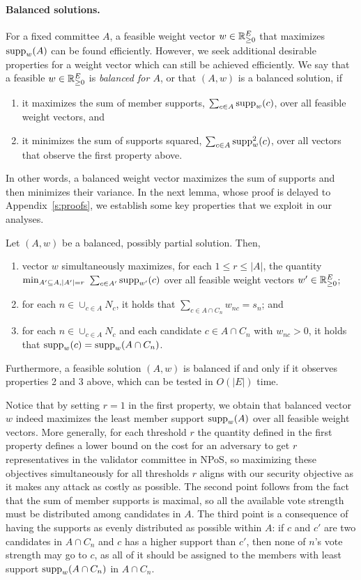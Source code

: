 \paragraph{Balanced solutions.}
For a fixed committee $A$, a feasible weight vector $w\in\mathbb{R}_{\geq 0}^E$ that maximizes $\operatorname{supp}_w(A)$ can be found efficiently. 
However, we seek additional desirable properties for a weight vector which can still be achieved efficiently. We say that a feasible $w\in\mathbb{R}_{\geq 0}^E$ is \emph{balanced for $A$}, or that $(A,w)$ is a balanced solution, if
\begin{enumerate}
    \item it maximizes the sum of member supports, $\sum_{c\in A} \operatorname{supp}_w(c)$, over all feasible weight vectors, and 
    \item it minimizes the sum of supports squared, $\sum_{c\in A} \operatorname{supp}_w^2(c)$, over all vectors that observe the first property above. 
\end{enumerate}
%
In other words, a balanced weight vector maximizes the sum of supports and then minimizes their variance. 
In the next lemma, whose proof is delayed to Appendix~\ref{s:proofs}, we establish some key properties that we exploit in our analyses. 

\begin{lemma}\label{lem:balanced}
Let $(A,w)$ be a balanced, possibly partial solution. Then,
\begin{enumerate}
    \item vector $w$ simultaneously maximizes, for each $1\leq r \leq |A|$, the quantity $\min_{A'\subseteq A, |A'|=r} \ \sum_{c\in A'} \supp_{w'}(c)$ over all feasible weight vectors $w'\in\mathbb{R}_{\geq 0}^E$; 
		\item for each $n\in \cup_{c\in A} N_c$, it holds that $\sum_{c\in A\cap C_n} w_{nc}=s_n$; and
    \item for each $n\in \cup_{c\in A} N_c$ and each candidate $c\in A\cap C_n$ with $w_{nc} > 0$, it holds that $\operatorname{supp}_w(c)=\operatorname{supp}_w(A\cap C_n)$. 
\end{enumerate}
Furthermore, a feasible solution $(A,w)$ is balanced if and only if it observes properties 2 and 3 above, which can be tested in $O(|E|)$ time.
\end{lemma}

Notice that by setting $r=1$ in the first property, we obtain that balanced vector $w$ indeed maximizes the least member support $\operatorname{supp}_w(A)$ over all feasible weight vectors. 
More generally, for each threshold $r$ the quantity defined in the first property defines a lower bound on the cost for an adversary to get $r$ representatives in the validator committee in NPoS, so maximizing these objectives simultaneously for all thresholds $r$ aligns with our security objective as it makes any attack as costly as possible. 
The second point follows from the fact that the sum of member supports is maximal, so all the available vote strength must be distributed among candidates in $A$. 
The third point is a consequence of having the supports as evenly distributed as possible within $A$: if $c$ and $c'$ are two candidates in $A\cap C_n$ and $c$ has a higher support than $c'$, then none of $n$'s vote strength may go to $c$, as all of it should be assigned to the members with least support $\operatorname{supp}_w(A\cap C_n)$ in $A\cap C_n$. 

